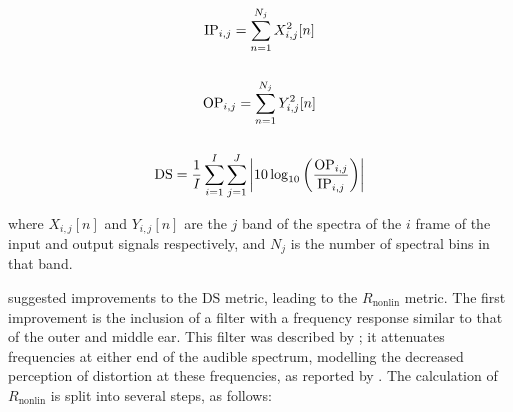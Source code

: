 			\begin{gather}
				\mathrm{IP}_{i,j} = \sum_{n = 1}^{N_{j}} X_{i,j}^{2}[n] \nonumber \\
				\nonumber \\
				\mathrm{OP}_{i,j} = \sum_{n = 1}^{N_{j}} Y_{i,j}^{2}[n] \nonumber \\
				\nonumber \\
				\mathrm{DS} = \frac{1}{I} \sum_{i = 1}^{I} \sum_{j = 1}^{J} 
					\left|10\log_{10} \left( \frac{\mathrm{OP}_{i,j}}{\mathrm{IP}_{i,j}} \right) \right|
				\label{eq:DistortionScore}
			\end{gather}

			where $X_{i,j}[n]$ and $Y_{i,j}[n]$ are the $j$ band of the spectra of the $i$
			frame of the input and output signals respectively, and $N_{j}$ is the number of spectral bins in
			that band.
			
			\citet{tan2004predicting} suggested improvements to the $\mathrm{DS}$ metric, leading to the
			$R_{\mathrm{nonlin}}$ metric. The first improvement is the inclusion of a filter with a frequency
			response similar to that of the outer and middle ear. This filter was described by
			\citet{glasberg2002a}; it attenuates frequencies at either end of the audible spectrum, modelling
			the decreased perception of distortion at these frequencies, as reported by
			\citet{voishvillo2006assessment}. The calculation of $R_{\mathrm{nonlin}}$ is split into several
			steps, as follows:
			
